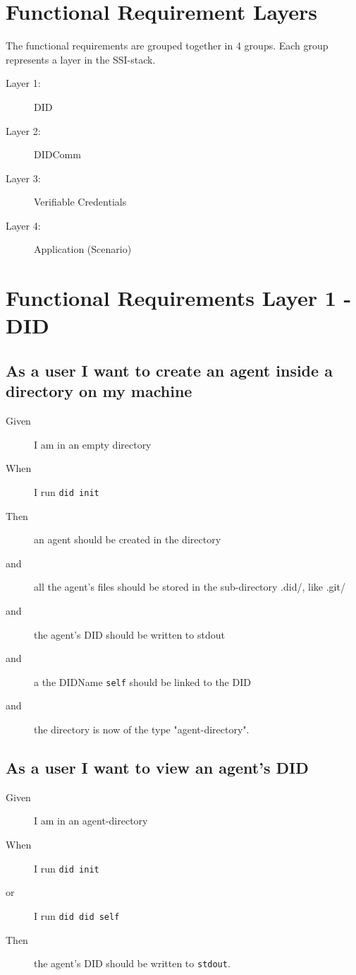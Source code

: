 \section{Functional Requirement Layers}

The functional requirements are grouped together in 4 groups. Each group represents a layer in the SSI-stack.
\begin{description}
    \item[Layer 1:] DID 
    \item[Layer 2:] DIDComm
    \item[Layer 3:] Verifiable Credentials
    \item[Layer 4:] Application (Scenario)
\end{description}


\newpage

\section{Functional Requirements Layer 1 - DID}


\subsection{As a user I want to create an agent inside a directory on my machine}
\begin{description}\begin{description}
    \item[Given] I am in an empty directory
    \item[When] I run \texttt{did init}
    \item[Then] an agent should be created in the directory
    \item[and] all the agent's files should be stored in the sub-directory .did/, like .git/
    \item[and] the agent's DID should be written to stdout 
    \item[and] a the DIDName \texttt{self} should be linked to the DID
    \item[and] the directory is now of the type "agent-directory".
\end{description}\end{description}


\subsection{As a user I want to view an agent's DID}
\begin{description}\begin{description}
    \item[Given] I am in an agent-directory
    \item[When] I run \texttt{did init}
    \item[or] I run \texttt{did did self}
    \item[Then] the agent's DID should be written to \texttt{stdout}.
\end{description}\end{description}


